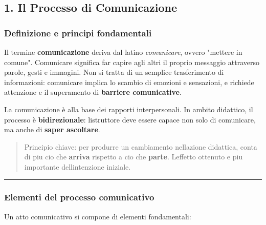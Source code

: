 \documentclass[a4paper,11pt]{article}
\begin{document}
\subsection{1. Il Processo di
      Comunicazione}\label{il-processo-di-comunicazione}

\subsubsection{Definizione e principi
      fondamentali}\label{definizione-e-principi-fondamentali}

Il termine \textbf{comunicazione} deriva dal latino \emph{comunicare},
ovvero "mettere in comune". Comunicare significa far capire agli altri
il proprio messaggio attraverso parole, gesti e immagini. Non si tratta
di un semplice trasferimento di informazioni: comunicare implica lo
scambio di emozioni e sensazioni, e richiede attenzione e il superamento
di \textbf{barriere comunicative}.

La comunicazione è alla base dei rapporti interpersonali. In ambito
didattico, il processo è \textbf{bidirezionale}:
l\textquotesingle istruttore deve essere capace non solo di comunicare,
ma anche di \textbf{saper ascoltare}.

\begin{quote}
      Principio chiave: per produrre un cambiamento
      nell\textquotesingle azione didattica, conta di piu cio che
      \textbf{arriva} rispetto a cio che \textbf{parte}.
      L\textquotesingle effetto ottenuto e piu importante
      dell\textquotesingle intenzione iniziale.
\end{quote}

\begin{center}\rule{0.5\linewidth}{0.5pt}\end{center}

\subsubsection{Elementi del processo
      comunicativo}\label{elementi-del-processo-comunicativo}

Un atto comunicativo si compone di elementi fondamentali:
\end{document}
